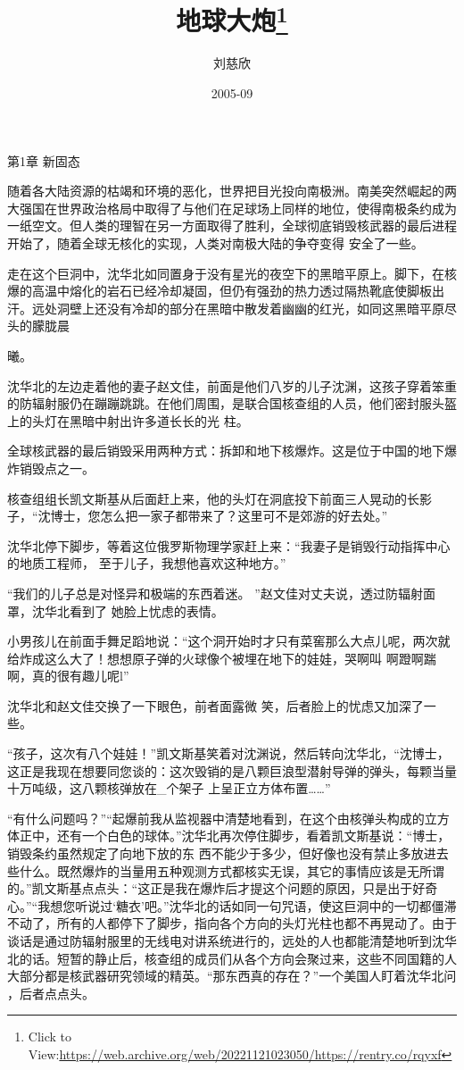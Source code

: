 \documentclass{article}
\title{地球大炮\footnote{Click to View:\url{https://web.archive.org/web/20221121023050/https://rentry.co/rqyxf}}}
\author{刘慈欣}
\date{2005-09}
\begin{document}

\maketitle


\Large


﻿第1章 新固态 

随着各大陆资源的枯竭和环境的恶化，世界把目光投向南极洲。南美突然崛起的两大强国在世界政治格局中取得了与他们在足球场上同样的地位，使得南极条约成为一纸空文。但人类的理智在另一方面取得了胜利，全球彻底销毁核武器的最后进程开始了，随着全球无核化的实现，人类对南极大陆的争夺变得
安全了一些。 

走在这个巨洞中，沈华北如同置身于没有星光的夜空下的黑暗平原上。脚下，在核爆的高温中熔化的岩石已经冷却凝固，但仍有强劲的热力透过隔热靴底使脚板出汗。远处洞壁上还没有冷却的部分在黑暗中散发着幽幽的红光，如同这黑暗平原尽头的朦胧晨
\newpage

曦。 

沈华北的左边走着他的妻子赵文佳，前面是他们八岁的儿子沈渊，这孩子穿着笨重的防辐射服仍在蹦蹦跳跳。在他们周围，是联合国核查组的人员，他们密封服头盔上的头灯在黑暗中射出许多道长长的光
柱。 

全球核武器的最后销毁采用两种方式：拆卸和地下核爆炸。这是位于中国的地下爆炸销毁点之一。
 

核查组组长凯文斯基从后面赶上来，他的头灯在洞底投下前面三人晃动的长影子，“沈博士，您怎么把一家子都带来了？这里可不是郊游的好去处。”

沈华北停下脚步，等着这位俄罗斯物理学家赶上来：“我妻子是销毁行动指挥中心的地质工程师，
至于儿子，我想他喜欢这种地方。” 

“我们的儿子总是对怪异和极端的东西着迷。
\newpage
”赵文佳对丈夫说，透过防辐射面罩，沈华北看到了
她脸上忧虑的表情。 

小男孩儿在前面手舞足蹈地说：“这个洞开始时才只有菜窖那么大点儿呢，两次就给炸成这么大了！想想原子弹的火球像个被埋在地下的娃娃，哭啊叫
啊蹬啊踹啊，真的很有趣儿呢l” 

沈华北和赵文佳交换了一下眼色，前者面露微
笑，后者脸上的忧虑又加深了一些。 

“孩子，这次有八个娃娃！”凯文斯基笑着对沈渊说，然后转向沈华北，“沈博士，这正是我现在想要同您谈的：这次毁销的是八颗巨浪型潜射导弹的弹头，每颗当量十万吨级，这八颗核弹放在_个架子
上呈正立方体布置……” 

“有什么问题吗？”“起爆前我从监视器中清楚地看到，在这个由核弹头构成的立方体正中，还有一个白色的球体。”沈华北再次停住脚步，看着凯文斯基说：“博士，销毁条约虽然规定了向地下放的东
\newpage
西不能少于多少，但好像也没有禁止多放进去些什么。既然爆炸的当量用五种观测方式都核实无误，其它的事情应该是无所谓的。”凯文斯基点点头：“这正是我在爆炸后才提这个问题的原因，只是出于好奇心。”“我想您听说过‘糖衣’吧。”沈华北的话如同一句咒语，使这巨洞中的一切都僵滞不动了，所有的人都停下了脚步，指向各个方向的头灯光柱也都不再晃动了。由于谈话是通过防辐射服里的无线电对讲系统进行的，远处的人也都能清楚地听到沈华北的话。短暂的静止后，核查组的成员们从各个方向会聚过来，这些不同国籍的人大部分都是核武器研究领域的精英。“那东西真的存在？”一个美国人盯着沈华北问
，后者点点头。 
\end{document}
